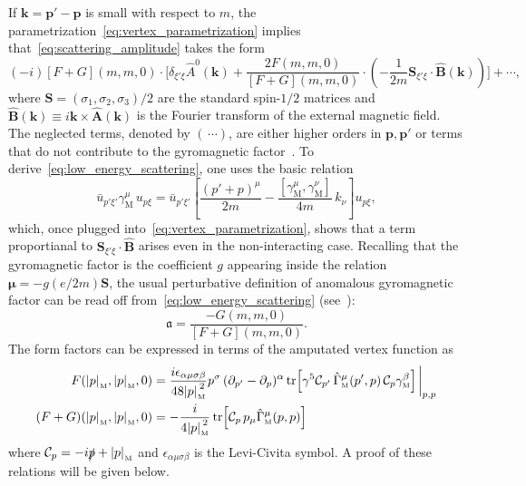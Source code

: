 \documentclass[a4paper, 11pt]{article}
\newcommand{\gyr}{\mathfrak{a}}								%
\newcommand{\mnorm}[1]			
	{\abs*{#1}_{\! \scriptscriptstyle \mathrm{M}}}			%
\newcommand{\mink}{{\scriptscriptstyle{\mathrm{M}}}}		%
\newcommand{\mproj}[1]{\mathcal{C}_{#1}}					%
\theoremstyle{thm}
\begin{document}
If $\mathbf{k} = \mathbf{p}' - \mathbf{p}$ is small with respect to $m$, the parametrization~\eqref{eq:vertex_parametrization} implies that~\eqref{eq:scattering_amplitude} takes the form
\begin{equation}
\label{eq:low_energy_scattering}
(-i) [F + G](m, m, 0) \cdot \biggl[ \delta_{\xi' \xi} \hat{A}^0(\mathbf{k}) +\frac{2F(m, m, 0)}{[F + G](m, m, 0)} \cdot \left(-\frac{1}{2m} \mathbf{S}_{\xi' \xi} \cdot \hat{\mathbf{B}}(\mathbf{k}) \right) \biggr] + \cdots,
\end{equation}
where $\mathbf{S} = (\sigma_1, \sigma_2, \sigma_3)/2$ are the standard spin-$1/2$ matrices and $\hat{\mathbf{B}}(\mathbf{k}) \equiv i \mathbf{k} \times \hat{\mathbf{A}}(\mathbf{k})$ is the Fourier transform of the external magnetic field. The neglected terms, denoted by $(\, \cdots)$, are either higher orders in $\mathbf{p}, \mathbf{p}'$ or terms that do not contribute to the gyromagnetic factor~\cite{Nowakowski_2005}. To derive~\eqref{eq:low_energy_scattering}, one uses the basic relation
\begin{equation}
\bar{u}_{p' \xi'} \gamma^\mu_\mink \, u_{p \xi}=
 \bar{u}_{p' \xi'} \left[ \frac{(p' + p)^\mu}{2m} - \frac{[\gamma^\mu_\mink, \gamma^\nu_\mink]}{4m} \, k_\nu \right] u_{p \xi},
\end{equation}
which, once plugged into~\eqref{eq:vertex_parametrization}, shows that a term proportianal to $\mathbf{S}_{\xi' \xi} \cdot \hat{\mathbf{B}}$ arises even in the non-interacting case. 
Recalling that the gyromagnetic factor is the coefficient $g$ appearing inside the relation $\bm{\mu} = -g (e/2m) \mathbf{S}$, the usual perturbative definition of anomalous gyromagnetic factor can be read off from~\eqref{eq:low_energy_scattering} (see~\cite[Equation (6.37)]{Peskin_1995}):
\begin{equation}
\label{eq:g_form_factors}
\gyr = \frac{-G(m, m, 0)}{[F + G](m, m, 0)}.
\end{equation}
The form factors can be expressed in terms of the amputated vertex function as
\begin{align}
\label{eq:F_factor}
F(\mnorm{p}, \mnorm{p}, 0) & = \frac{i\epsilon_{\alpha \mu \sigma \beta}}{48 \mnorm{p}^2} p^\sigma \, (\partial_{p'} - \partial_p)^\alpha \tr[\gamma^5 \mproj{p'} \, \hat{\Gamma}_\mink^\mu(p', p) \, \mproj{p} \gamma^\beta_\mink] \eval_{p, p} \\
\label{eq:F_G_factor}
(F + G)(\mnorm{p}, \mnorm{p}, 0) & = -\frac{i}{4 \mnorm{p}^2} \tr[\mproj{p} \, p_\mu \hat{\Gamma}^\mu_\mink(p, p)]
\end{align}
where $\mproj{p} = -i \slashed{p} + \mnorm{p}$ and $\epsilon_{\alpha \mu \sigma \beta}$ is the Levi-Civita symbol. A proof of these relations will be given below.
\end{document}
